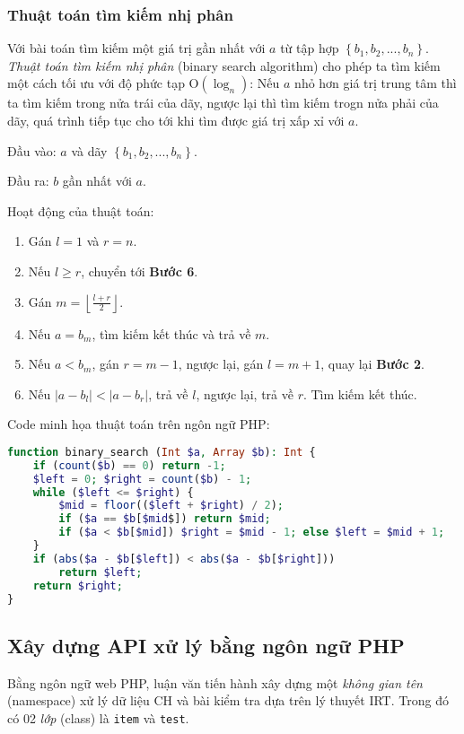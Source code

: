 \subsubsection{Thuật toán tìm kiếm nhị phân}
Với bài toán tìm kiếm một giá trị gần nhất với $a$ từ tập hợp $\left\{b_1,b_2,...,b_n\right\}$. \textit{Thuật toán tìm kiếm nhị phân} (binary search algorithm) cho phép ta tìm kiếm một cách tối ưu với độ phức tạp $\mathrm{O}\left(\log_n\right)$: Nếu $a$ nhỏ hơn giá trị trung tâm thì ta tìm kiếm trong nửa trái của dãy, ngược lại thì tìm kiếm trogn nửa phải của dãy, quá trình tiếp tục cho tới khi tìm được giá trị xấp xỉ với $a$.\par
\noindent Đầu vào: $a$ và dãy $\left\{b_1,b_2,...,b_n\right\}$.\par
\noindent Đầu ra: $b$ gần nhất với $a$.\par
\noindent Hoạt động của thuật toán:\par
\begin{enumerate}[label=\textbf{Bước \arabic*.},align=left,left=0cm..0cm,itemindent=*]
	\item Gán $l=1$ và $r=n$.
	\item Nếu $l\geqslant r$, chuyển tới \textbf{Bước 6}.
	\item Gán $m=\left\lfloor\frac{l+r}{2}\right\rfloor$.
	\item Nếu $a=b_m$, tìm kiếm kết thúc và trả về $m$.
	\item Nếu $a<b_m$, gán $r=m-1$, ngược lại, gán $l=m+1$, quay lại \textbf{Bước 2}.
	\item Nếu $|a-b_l|<|a-b_r|$, trả về $l$, ngược lại, trả về $r$. Tìm kiếm kết thúc.
\end{enumerate}
\noindent Code minh họa thuật toán trên ngôn ngữ PHP:
\begin{lstlisting}[language=php,caption=Phương thức tìm kiếm nhị phân]
function binary_search (Int $a, Array $b): Int {
	if (count($b) == 0) return -1;
	$left = 0; $right = count($b) - 1;
	while ($left <= $right) {
		$mid = floor(($left + $right) / 2);
		if ($a == $b[$mid$]) return $mid;
		if ($a < $b[$mid]) $right = $mid - 1; else $left = $mid + 1;
	}
	if (abs($a - $b[$left]) < abs($a - $b[$right]))
		return $left;
	return $right;
}
\end{lstlisting}
\subsection{Xây dựng API xử lý bằng ngôn ngữ PHP}
Bằng ngôn ngữ web PHP, luận văn tiến hành xây dựng một \textit{không gian tên} (namespace) xử lý dữ liệu CH và bài kiểm tra dựa trên lý thuyết IRT. Trong đó có 02 \textit{lớp} (class) là \texttt{item} và \texttt{test}.
